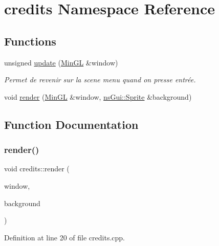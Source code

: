 \hypertarget{namespacecredits}{}\section{credits Namespace Reference}
\label{namespacecredits}
\subsection*{Functions}
\begin{DoxyCompactItemize}
\item 
unsigned \hyperlink{namespacecredits_acec869002c2f3db407235874bf167e1b}{update} (\hyperlink{class_min_g_l}{Min\+GL} \&window)
\begin{DoxyCompactList}\small\item\em Permet de revenir sur la scene menu quand on presse entrée. \end{DoxyCompactList}\item 
void \hyperlink{namespacecredits_a551fe422f01f13f9ecde86629cfd88c0}{render} (\hyperlink{class_min_g_l}{Min\+GL} \&window, \hyperlink{classns_gui_1_1_sprite}{ns\+Gui\+::\+Sprite} \&background)
\end{DoxyCompactItemize}


\subsection{Function Documentation}
\mbox{\label{namespacecredits_a551fe422f01f13f9ecde86629cfd88c0}} 
\subsubsection{\texorpdfstring{render()}{render()}}
{\footnotesize\ttfamily void credits\+::render (\begin{DoxyParamCaption}\item[{\hyperlink{class_min_g_l}{Min\+GL} \&}]{window,  }\item[{\hyperlink{classns_gui_1_1_sprite}{ns\+Gui\+::\+Sprite} \&}]{background }\end{DoxyParamCaption})}



Definition at line 20 of file credits.\+cpp.

\mbox{\label{namespacecredits_acec869002c2f3db407235874bf167e1b}} 
